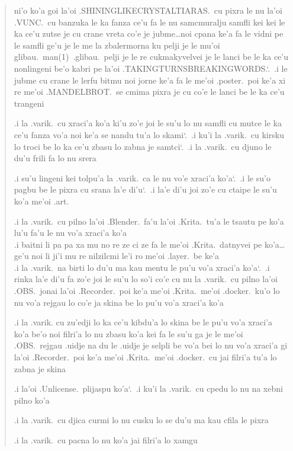 \documentclass{report}
\newcommand\sds{\spacefactor\sfcode`.\ \space}
\begin{document}
\begin{quote}
	ni'o ko'a goi la'oi .SHININGLIKECRYSTALTIARAS.\ cu pixra le nu la'oi .VUNC.\ cu banzuka le ka fanza ce'u fa le nu samcmuralju samfli kei kei le ka ce'u zutse je cu crane vreta co'e je jubme\ldots noi cpana ke'a fa le vidni pe le samfli ge'u je le me la zbalermorna ku pelji je le mu'oi glibau.\ man(1)\ .glibau.\ pelji je le re cukmakyvelvei je le lanci be le ka ce'u nonlingeni be'o kabri pe la'oi .TAKINGTURNSBREAKINGWORDS.\sds  .i le jubme cu crane le lerfu bitmu noi jorne ke'a fa le me'oi .poster.\ poi ke'a xi re me'oi .MANDELBROT.\ se cmima pixra je cu co'e le lanci be le ka ce'u trangeni

	.i la .varik.\ cu xraci'a ko'a ki'u zo'e joi le su'u lo nu samfli cu mutce le ka ce'u fanza vo'a noi ke'a se nandu tu'a lo skami\sds  .i ku'i la .varik.\ cu kirsku lo troci be lo ka ce'u zbasu lo zabna je samtci\sds  .i la .varik.\ cu djuno le du'u frili fa lo nu srera

	.i su'u lingeni kei tolpu'a la .varik.\ ca le nu vo'e xraci'a ko'a\sds  .i le su'o pagbu be le pixra cu srana la'e di'u\sds  .i la'e di'u joi zo'e cu ctaipe le su'u ko'a me'oi .art.

	.i la .varik.\ cu pilno la'oi .Blender.\ fa'u la'oi .Krita.\ tu'a le tsautu pe ko'a lu'u fa'u le nu vo'a xraci'a ko'a \\
	.i baitni li pa pa xa mu no re ze ci ze fa le me'oi .Krita.\ datnyvei pe ko'a\ldots ge'u noi li ji'i mu re nilzilcmi le'i ro me'oi .layer.\ be ke'a \\
	.i la .varik.\ na birti lo du'u ma kau mentu le pu'u vo'a xraci'a ko'a\sds  .i rinka la'e di'u fa zo'e joi le su'u lo so'i co'e cu nu la .varik.\ cu pilno la'oi .OBS.\ jonai la'oi .Recorder.\ poi ke'a me'oi .Krita.\ me'oi .docker.\ ku'o lo nu vo'a rejgau lo co'e ja skina be lo pu'u vo'a xraci'a ko'a

	.i la .varik. cu zu'edji lo ka ce'u kibdu'a lo skina be le pu'u vo'a xraci'a ko'a be'o noi filri'a lo nu zbasu ko'a kei fa le su'u ga je le me'oi .OBS.\ rejgau .uidje na du le .uidje je selpli be vo'a bei lo nu vo'a xraci'a gi la'oi .Recorder.\ poi ke'a me'oi .Krita.\ me'oi .docker.\ cu jai filri'a tu'a lo zabna je skina

	.i la'oi .Unlicense.\ plijaspu ko'a\sds  .i ku'i la .varik.\ cu cpedu lo nu na xebni pilno ko'a

	.i la .varik.\ cu djica curmi lo nu cusku lo se du'u ma kau cfila le pixra

	.i la .varik.\ cu pacna lo nu ko'a jai filri'a lo xamgu
\end{quote}
\end{document}
